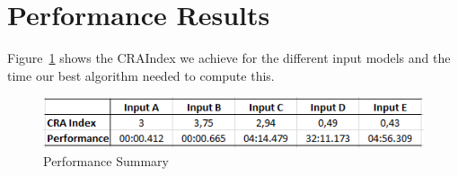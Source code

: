\documentclass[a4paper]{article}
\begin{document}
\section{Performance Results}
\label{sec:results}

Figure~\ref{fig:PerformanceSummary} shows the CRAIndex we achieve for the 
different input models and the time our best algorithm needed to compute this. 

\begin{figure}[H] \centering
	\includegraphics[width=0.8\linewidth]{images/performanceSummary.png}
 \caption{Performance Summary}
 \label{fig:PerformanceSummary}
\end{figure}




  
\end{document}
